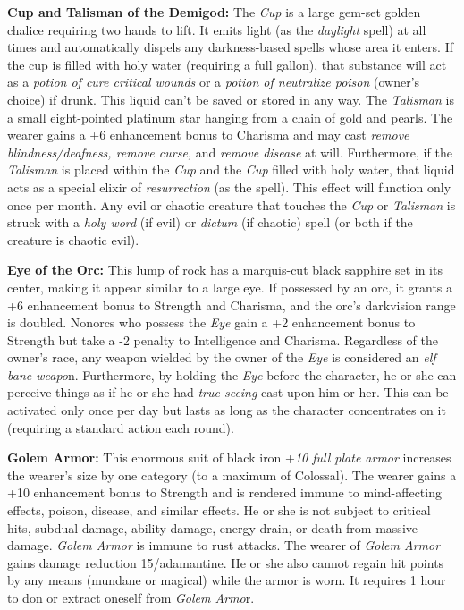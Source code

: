 \documentclass{article}
\begin{document}
\textbf{Cup and Talisman of the Demigod: }The \textit{Cup }is a large gem-set golden 
chalice requiring two hands to lift. It emits light (as the \textit{daylight }spell) 
at all times and automatically dispels any darkness-based spells whose area it 
enters. If the cup is filled with holy water (requiring a full gallon), that substance 
will act as a \textit{potion of cure critical wounds }or a \textit{potion of neutralize 
poison }(owner's choice) if drunk. This liquid can't be saved or stored in any 
way. The \textit{Talisman }is a small eight-pointed platinum star hanging from 
a chain of gold and pearls. The wearer gains a +6 enhancement bonus to Charisma 
and may cast \textit{remove blindness/deafness, remove curse, }and \textit{remove 
disease }at will. Furthermore, if the \textit{Talisman }is placed within the \textit{Cup 
}and the \textit{Cup }filled with holy water, that liquid acts as a special elixir 
of \textit{resurrection }(as the spell). This effect will function only once per 
month. Any evil or chaotic creature that touches the \textit{Cup }or \textit{Talisman 
}is struck with a \textit{holy word }(if evil) or \textit{dictum }(if chaotic) 
spell (or both if the creature is chaotic evil). 

\textbf{Eye of the Orc: }This lump of rock has a marquis-cut black sapphire set 
in its center, making it appear similar to a large eye. If possessed by an orc, 
it grants a +6 enhancement bonus to Strength and Charisma, and the orc's darkvision 
range is doubled. Nonorcs who possess the \textit{Eye }gain a +2 enhancement bonus 
to Strength but take a -2 penalty to Intelligence and Charisma. Regardless of the 
owner's race, any weapon wielded by the owner of the \textit{Eye }is considered 
an \textit{elf bane weapo}n. Furthermore, by holding the \textit{Eye }before the 
character, he or she can perceive things as if he or she had \textit{true seeing 
}cast upon him or her. This can be activated only once per day but lasts as long 
as the character concentrates on it (requiring a standard action each round). 

\textbf{Golem Armor: }This enormous suit of black iron +\textit{10 full plate armor 
}increases the wearer's size by one category (to a maximum of Colossal). The wearer 
gains a +10 enhancement bonus to Strength and is rendered immune to mind-affecting 
effects, poison, disease, and similar effects. He or she is not subject to critical 
hits, subdual damage, ability damage, energy drain, or death from massive damage. 
\textit{Golem Armor }is immune to rust attacks. The wearer of \textit{Golem Armor 
}gains damage reduction 15/adamantine. He or she also cannot regain hit points 
by any means (mundane or magical) while the armor is worn. It requires 1 hour to 
don or extract oneself from \textit{Golem Armo}r. 
\end{document}
